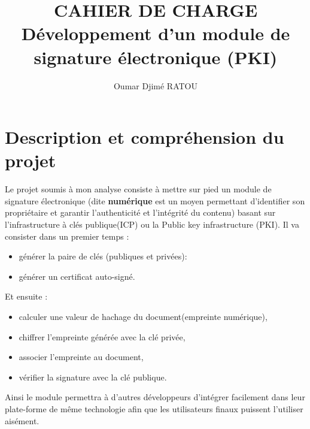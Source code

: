 \documentclass[12pt,a4paper]{article}
\begin{document}
\title{
	{\textbf{{\Huge CAHIER DE CHARGE}}}\\
	\vspace*{2cm}
	{Développement d'un module de signature électronique (PKI)}
}

\author{Oumar Djimé RATOU}

\maketitle


\newpage
\tableofcontents
\newpage


\section{Description et compréhension du projet}

	Le projet soumis à mon analyse consiste à mettre sur pied un module de signature électronique (dite \textbf{numérique} est un moyen permettant d'identifier son propriétaire et garantir l'authenticité et l'intégrité du contenu)  basant sur  l'infrastructure à clés publique(ICP) ou la Public key infrastructure (PKI). Il va consister  dans un premier temps :\\
	\begin{itemize}
		\item générer la paire de clés (publiques et privées):
		\item générer un certificat auto-signé.\\
\end{itemize}		
	   Et ensuite :\\
	\begin{itemize}
	\item calculer une valeur de hachage du document(empreinte numérique),
	\item chiffrer l'empreinte générée avec la clé privée,
	\item associer l'empreinte au document,
	\item vérifier la signature avec la clé publique.\\
\end{itemize}		   
	
	 Ainsi le module permettra à d'autres développeurs d'intégrer facilement dans leur plate-forme de même technologie afin que les utilisateurs finaux puissent l'utiliser aisément.\\
	 
\end{document}
